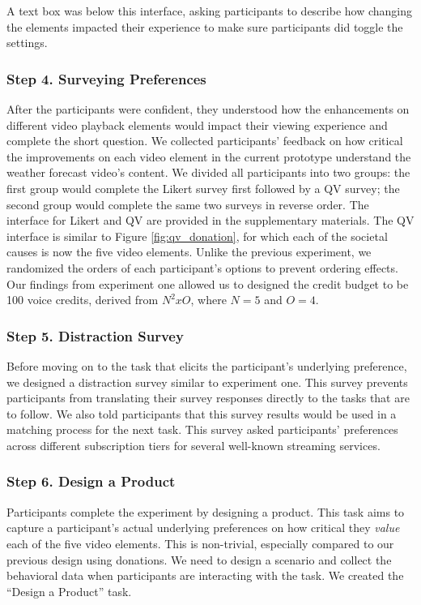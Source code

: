 A text box was below this interface, asking participants to describe how changing the elements impacted their experience to make sure participants did toggle the settings.

\subsubsection{Step 4. Surveying Preferences}
After the participants were confident, they understood how the enhancements on different video playback elements would impact their viewing experience and complete the short question. We collected participants' feedback on how critical the improvements on each video element in the current prototype understand the weather forecast video's content. We divided all participants into two groups: the first group would complete the Likert survey first followed by a QV survey; the second group would complete the same two surveys in reverse order. The interface for Likert and QV are provided in the supplementary materials. The QV interface is similar to Figure \ref{fig:qv_donation}, for which each of the societal causes is now the five video elements. Unlike the previous experiment, we randomized the orders of each participant's options to prevent ordering effects. Our findings from experiment one allowed us to designed the credit budget to be 100 voice credits, derived from $N^2 x O$, where $N=5$ and $O=4$.

\subsubsection{Step 5. Distraction Survey}
Before moving on to the task that elicits the participant's underlying preference, we designed a distraction survey similar to experiment one. This survey prevents participants from translating their survey responses directly to the tasks that are to follow. We also told participants that this survey results would be used in a matching process for the next task. This survey asked participants' preferences across different subscription tiers for several well-known streaming services.

\subsubsection{Step 6. Design a Product}
Participants complete the experiment by designing a product. This task aims to capture a participant's actual underlying preferences on how critical they \textit{value} each of the five video elements. This is non-trivial, especially compared to our previous design using donations. We need to design a scenario and collect the behavioral data when participants are interacting with the task. We created the ``Design a Product'' task.

